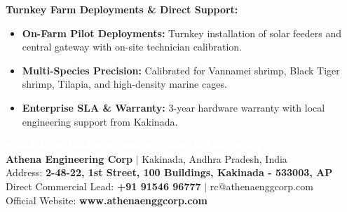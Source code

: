 \documentclass[10pt,a4paper]{article}
\begin{document}
\begin{minipage}[t]{0.488\linewidth}
  \begin{tcolorbox}[
    enhanced,
    colback=CardBg,
    colframe=NavyDark,
    arc=2mm,
    boxrule=1.1pt,
    title={\fontsize{8.5}{10.5}\selectfont \textbf{\textcolor{white}{Athena Engineering Corp $\vert$ Kakinada, India}}},
    coltitle=white,
    colbacktitle=NavyDark,
    top=6pt, bottom=6pt, left=8pt, right=8pt
  ]
    {\fontsize{7.5}{9.8}\selectfont \textcolor{TextPrimary}{
    \textbf{Turnkey Farm Deployments \& Direct Support:}
    \begin{itemize}[leftmargin=10pt, itemsep=2pt, topsep=2pt, parsep=0pt]
      \item \textbf{On-Farm Pilot Deployments:} Turnkey installation of solar feeders and central gateway with on-site technician calibration.
      \item \textbf{Multi-Species Precision:} Calibrated for Vannamei shrimp, Black Tiger shrimp, Tilapia, and high-density marine cages.
      \item \textbf{Enterprise SLA \& Warranty:} 3-year hardware warranty with local engineering support from Kakinada.
    \end{itemize}
    \vspace{3pt}
    \begin{tcolorbox}[
      enhanced,
      colback=NavyDark,
      colframe=CyanAccent,
      colupper=white,
      arc=1.5mm,
      boxrule=0.8pt,
      top=4pt, bottom=4pt, left=6pt, right=6pt
    ]
      \centering
      {\fontsize{8.5}{10.5}\selectfont \textbf{\textcolor{white}{Schedule an On-Farm Demonstration \& Site Survey}}}\\[2pt]
      {\fontsize{7.5}{9}\selectfont \textcolor{CyanAccent}{\textbf{Athena Engineering Corp}} $\vert$ Kakinada, Andhra Pradesh, India}\\[1pt]
      {\fontsize{7}{8.5}\selectfont \textcolor{BorderLight}{Address: \textbf{2-48-22, 1st Street, 100 Buildings, Kakinada - 533003, AP}}}\\[1pt]
      {\fontsize{7}{8.5}\selectfont \textcolor{BorderLight}{Direct Commercial Lead: \textbf{+91 91546 96777} $\vert$ rc@athenaenggcorp.com}}\\[1pt]
      {\fontsize{7}{8.5}\selectfont \textcolor{BorderLight}{Official Website: \textbf{www.athenaenggcorp.com}}}
    \end{tcolorbox}
    }}
  \end{tcolorbox}
\end{minipage}
\end{document}
